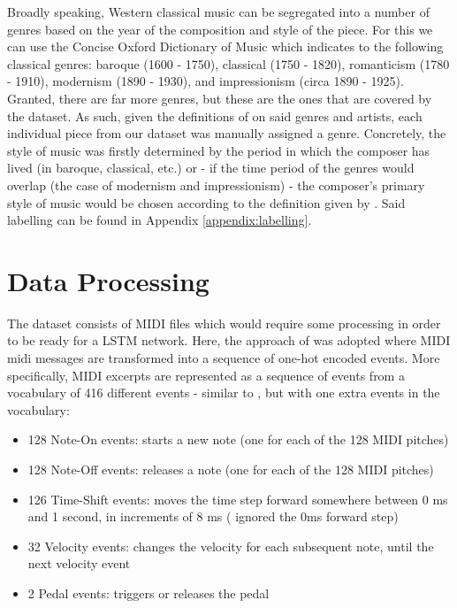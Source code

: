 \documentclass[a4paper]{book}
\begin{document}
Broadly speaking, Western classical music can be segregated into a number of genres based on the year of the composition and style of the piece. For this we can use the Concise Oxford Dictionary of Music \parencite{kennedy_concise_2007} which indicates to the following classical genres: baroque (1600 - 1750), classical (1750 - 1820), romanticism (1780 - 1910), modernism (1890 - 1930), and impressionism (circa 1890 - 1925). Granted, there are far more genres, but these are the ones that are covered by the dataset. As such, given the definitions of \textcite{kennedy_concise_2007} on said genres and artists, each individual piece from our dataset was manually assigned a genre. Concretely, the style of music was firstly determined by the period in which the composer has lived (in baroque, classical, etc.) or - if the time period of the genres would overlap (the case of modernism and impressionism) - the composer's primary style of music would be chosen according to the definition given by \textcite{kennedy_concise_2007}. Said labelling can be found in Appendix \ref{appendix:labelling}.

\section{Data Processing} \label{sec:data_proc}

The dataset consists of MIDI files which would require some processing in order to be ready for a LSTM network. Here, the approach of \textcite{oore_this_2018} was adopted where MIDI midi messages are transformed into a sequence of one-hot encoded events. More specifically, MIDI excerpts are represented as a sequence of events from a vocabulary of 416 different events - similar to \textcite{oore_this_2018}, but with one extra events in the vocabulary:
\begin{itemize}
    \item 128 Note-On events: starts a new note (one for each of the 128 MIDI pitches)
    \item 128 Note-Off events: releases a note (one for each of the 128 MIDI pitches)
    \item 126 Time-Shift events: moves the time step forward somewhere between 0 ms and 1 second, in increments of 8 ms (\textcite{oore_this_2018} ignored the 0ms forward step)
    \item 32 Velocity events: changes the velocity for each subsequent note, until the next velocity event
    \item 2 Pedal events: triggers or releases the pedal
\end{itemize}
\end{document}
